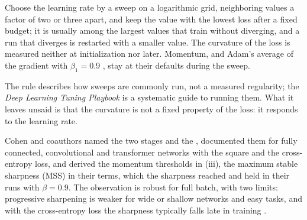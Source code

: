\begin{refsection}
\begin{practice}[folklore]
Choose the learning rate by a sweep on a logarithmic grid, neighboring values a factor of two or three apart, and keep the value with the lowest loss after a fixed budget; it is usually among the largest values that train without diverging, and a run that diverges is restarted with a smaller value. The curvature of the loss is measured neither at initialization nor later. Momentum, and Adam's average of the gradient with $\beta_1=0.9$ \parencite{KingmaBa2015}, stay at their defaults during the sweep.
\end{practice}

The rule describes how sweeps are commonly run, not a measured regularity; the \emph{Deep Learning Tuning Playbook} \parencite{GodboleEtAl2023} is a systematic guide to running them. What it leaves unsaid is that the curvature is not a fixed property of the loss: it responds to the learning rate.


Cohen and coauthors named the two stages  and the , documented them for fully connected, convolutional and transformer networks with the square and the cross-entropy loss, and derived the momentum thresholds in (iii), the maximum stable sharpness (MSS) in their terms, which the sharpness reached and held in their runs with $\beta=0.9$. The observation is robust for full batch, with two limits: progressive sharpening is weaker for wide or shallow networks and easy tasks, and with the cross-entropy loss the sharpness typically falls late in training \parencite{CohenEtAl2021}.


\end{refsection}
